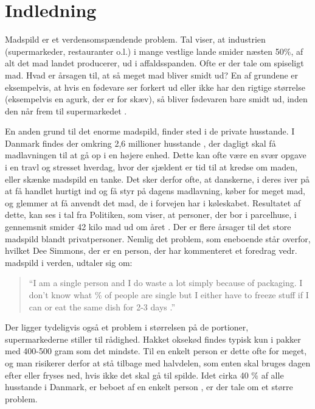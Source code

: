 \section{Indledning}
\label{sec:indledning}

Madspild er et verdensomspændende problem. Tal viser, at industrien (supermarkeder, restauranter o.l.) i mange vestlige lande smider næsten 50\%, af alt det mad landet producerer, ud i affaldsspanden. Ofte er der tale om spiseligt mad. Hvad er årsagen til, at så meget mad bliver smidt ud? En af grundene er eksempelvis, at hvis en fødevare ser forkert ud eller ikke har den rigtige størrelse (eksempelvis en agurk, der er for skæv), så bliver fødevaren bare smidt ud, inden den når frem til \fx supermarkedet \cite{tedmadspild}. 

En anden grund til det enorme madspild, finder sted i de private husstande. I Danmark findes der omkring 2,6 millioner husstande \cite{husstande}, der dagligt skal få madlavningen til at gå op i en højere enhed. Dette kan ofte være en svær opgave i en travl og stresset hverdag, hvor der sjældent er tid til at kredse om maden, eller skænke madspild en tanke. Det sker derfor ofte, at danskerne, i deres iver på at få handlet hurtigt ind og få styr på dagens madlavning, køber for meget mad, og glemmer at få anvendt det mad, de i forvejen har i køleskabet. Resultatet af dette, kan ses i tal fra Politiken, som viser, at personer, der bor i parcelhuse, i gennemsnit smider 42 kilo mad ud om året \cite{madspildpol}. Der er flere årsager til det store madspild blandt privatpersoner. Nemlig det problem, som eneboende står overfor, hvilket Dee Simmons, der er en person, der har kommenteret et foredrag vedr. madspild i verden, udtaler sig om: 

\begin{quote}
``I am a single person and I do waste a lot simply because of packaging. I don't know what \% of people are single but I either have to freeze stuff if I can or eat the same dish for 2-3 days \cite{tedcomment}.''
\end{quote}
 
Der ligger tydeligvis også et problem i størrelsen på de portioner, supermarkederne stiller til rådighed. Hakket oksekød findes typisk kun i pakker med 400-500 gram som det mindste. Til en enkelt person er dette ofte for meget, og man risikerer derfor at stå tilbage med halvdelen, som enten skal bruges dagen efter eller fryses ned, hvis ikke det skal gå til spilde. Idet cirka 40 \% af alle husstande i Danmark, er beboet af en enkelt person \cite{madspild16}, er der tale om et større problem.

